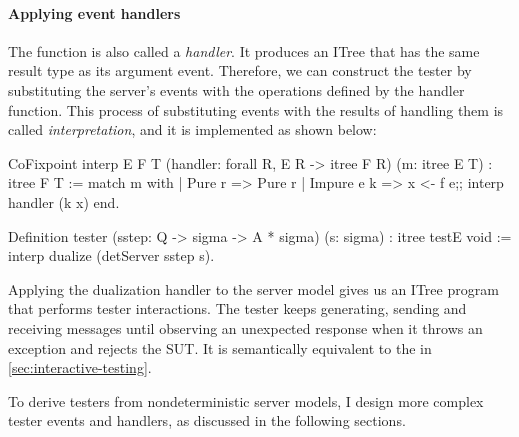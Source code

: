 \paragraph{Applying event handlers}
The  function is also called a {\em handler}.  It produces an ITree
that has the same result type as its argument event.  Therefore, we can
construct the tester by substituting the server's events with the operations
defined by the handler function.  This process of substituting events with the
results of handling them is called {\em interpretation}, and it is implemented
as shown below:
\begin{coq}
  CoFixpoint interp {E F T} (handler: forall {R}, E R -> itree F R) (m: itree E T)
             : itree F T :=
    match m with
    | Pure   r   => Pure r
    | Impure e k => x <- f e;;
                    interp handler (k x)
    end.

  Definition tester (sstep: Q -> sigma -> A * sigma) (s: sigma) : itree testE void :=
    interp dualize (detServer sstep s).
\end{coq}
Applying the dualization handler to the server model gives us an ITree program
that performs tester interactions.  The tester keeps generating, sending and
receiving messages until observing an unexpected response when it throws an
exception and rejects the SUT.  It is semantically equivalent to the
 in \autoref{sec:interactive-testing}.

To derive testers from nondeterministic server models, I design more complex
tester events and handlers, as discussed in the following sections.
